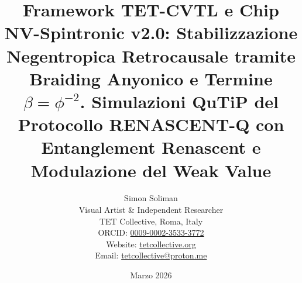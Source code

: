 \documentclass[11pt,a4paper]{article}
\theoremstyle{plain}
\theoremstyle{definition}
\begin{document}
\title{Framework TET-CVTL e Chip NV-Spintronic v2.0:  
Stabilizzazione Negentropica Retrocausale tramite Braiding Anyonico e Termine \(\beta = \phi^{-2}\).  Simulazioni QuTiP del Protocollo RENASCENT-Q con Entanglement Renascent e Modulazione del Weak Value
}





\author{Simon Soliman \\
Visual Artist \& Independent Researcher \\
TET Collective, Roma, Italy \\
ORCID: \href{https://orcid.org/0009-0002-3533-3772}{0009-0002-3533-3772} \\
Website: \href{https://tetcollective.org}{tetcollective.org} \\
Email: \href{mailto:tetcollective@proton.me}{tetcollective@proton.me}}

\date{Marzo 2026}






\maketitle
\end{document}
